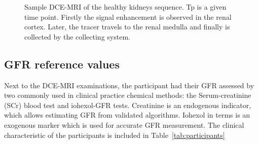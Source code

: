 \begin{figure}[H]
			\hspace{0.005\linewidth}
		\hspace{0.005\linewidth}
	\hspace{0.005\linewidth}
\vspace{0.5cm}
\caption[Sample DCE-MRI sequence of the healthy kidneys.]{Sample DCE-MRI of the healthy kidneys sequence. Tp is a given time point. Firstly the signal enhancement is observed in the renal cortex. Later, the tracer travels to the renal medulla and finally is collected by the collecting system.}
\label{fig:set}
\end{figure}


\subsection{GFR reference values}
Next to the DCE-MRI examinations, the participant had their GFR assessed by two commonly used in clinical practice chemical methods: the Serum-creatinine (SCr) blood test and iohexol-GFR tests. Creatinine is an endogenous indicator, which allows estimating GFR from validated algorithms.
Iohexol in terms is an exogenous marker which is used for accurate GFR measurement. The clinical characteristic of the participants is included in Table~\ref{tab:participants}

